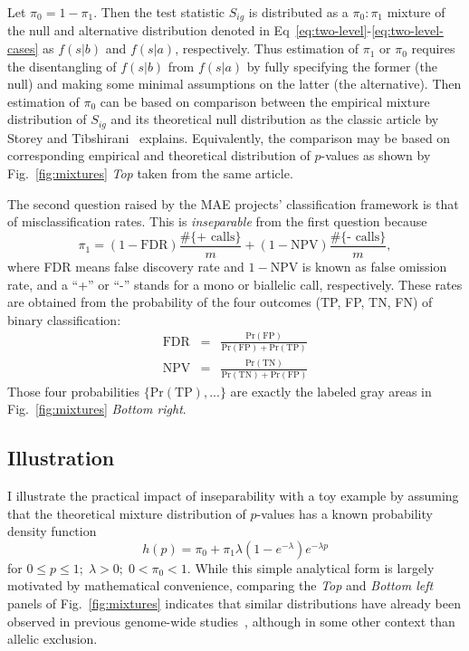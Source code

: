 \documentclass[letterpaper]{article}
\begin{document}
Let \(\pi_0=1-\pi_1\).  Then the test statistic \(S_{ig}\) is distributed as a
\(\pi_0 : \pi_1\) mixture of the null and alternative distribution denoted in
Eq~\ref{eq:two-level}-\ref{eq:two-level-cases} as \(f(s|b)\) and \(f(s|a)\),
respectively.  Thus estimation of \(\pi_1\) or \(\pi_0\) requires the
disentangling of \(f(s|b)\) from \(f(s|a)\) by fully specifying the former
(the null) and making some minimal assumptions on the latter (the
alternative).  Then estimation of \(\pi_0\) can be based on comparison between
the empirical mixture distribution of \(S_{ig}\) and its theoretical null
distribution as the classic article by Storey and
Tibshirani~\cite{Storey:2003kx} explains.  Equivalently, the comparison may be
based on corresponding empirical and theoretical distribution of \(p\)-values
as shown by Fig.~\ref{fig:mixtures} \emph{Top} taken from the same article.

The second question raised by the MAE projects' classification framework is
that of misclassification rates.  This is \emph{inseparable} from the first
question because
\begin{equation}
\label{eq:pi1-fdr-npv}
\pi_1 = (1 - \mathrm{FDR}) \frac{\#\{\text{+ calls}\}}{m}
+ (1 - \mathrm{NPV}) \frac{\#\{\text{- calls}\}}{m},
\end{equation}
where FDR means false discovery rate and \(1 - \mathrm{NPV}\) is known as
false omission rate, and a ``+'' or ``-'' stands for a mono or biallelic call,
respectively.  These rates are obtained from the probability of the
four outcomes (TP, FP, TN, FN) of binary classification:
\begin{eqnarray}
\label{eq:fdr-def}
\mathrm{FDR} &=& \frac{\mathrm{Pr}(\mathrm{FP})}{\mathrm{Pr}(\mathrm{FP}) +
\mathrm{Pr}(\mathrm{TP})} \\
\label{eq:npv-def}
\mathrm{NPV} &=& \frac{\mathrm{Pr}(\mathrm{TN})}{\mathrm{Pr}(\mathrm{TN}) +
\mathrm{Pr}(\mathrm{FP})}
\end{eqnarray}
Those four probabilities \(\{\mathrm{Pr}(\mathrm{TP}),...\}\) are exactly the
labeled gray areas in Fig.~\ref{fig:mixtures} \emph{Bottom right}.

\subsection{Illustration}

I illustrate the practical impact of inseparability with a toy example
by assuming that the theoretical mixture distribution of \(p\)-values has a known
probability density function
\begin{equation}
\label{eq:exp-unif-mixture}
h(p) = \pi_0 + \pi_1 \lambda (1 - e^{-\lambda}) e^{-\lambda p}
\end{equation}
for \(0 \leq p \leq 1; \; \lambda > 0; \; 0 < \pi_0 < 1\).  While this
simple analytical form is largely motivated by mathematical convenience, comparing
the \emph{Top} and \emph{Bottom left} panels of Fig.~\ref{fig:mixtures}
indicates that similar distributions have already been observed in previous
genome-wide studies~\cite{Storey:2003kx}, although in some other context than
allelic exclusion.
\end{document}

